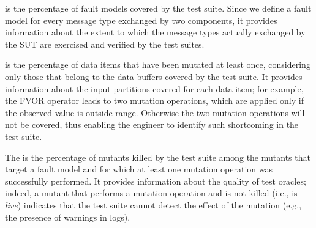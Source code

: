  is the percentage of fault models covered by the test suite. Since we define a fault model for every
message type exchanged by two components,
it provides information about the extent to which the message types actually exchanged by the SUT are exercised and verified by the test suites.

 is the percentage of data items that have been mutated at least once, considering only those that belong to the data buffers covered by the test suite. It provides information about the input partitions covered for each data item; for example, the FVOR operator leads to two mutation operations, which are applied only if the observed value is outside range. Otherwise the two mutation operations will not be covered, thus enabling the engineer to identify such shortcoming in the test suite.

The  is the percentage of mutants killed by the test suite  among the mutants that target a fault model and for which at least one mutation operation was successfully performed. It provides information about the quality of test oracles; indeed, a mutant that performs a mutation operation and is not killed (i.e., is \emph{live}) indicates that the test suite cannot detect the effect of the mutation (e.g., the presence of warnings in logs).


